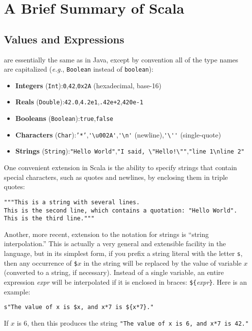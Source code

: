 
\section{A Brief Summary of Scala}
\subsection{Values and Expressions}
 are essentially the same as in Java, except by convention all of the type names are capitalized (\textit{e.g.}, \texttt{Boolean} instead of \texttt{boolean}):
\begin{itemize}
\item \textbf{Integers} (\texttt{Int}):\quad \texttt{0},\quad \texttt{42},\quad \texttt{0x2A} (hexadecimal, base-16)

\item \textbf{Reals} (\texttt{Double}):\quad \texttt{42.0},\quad \texttt{4.2e1},\quad \texttt{.42e+2},\quad \texttt{420e-1}

\item \textbf{Booleans} (\texttt{Boolean}):\quad \texttt{true},\quad \texttt{false}

\item \textbf{Characters} (\texttt{Char}):\quad \texttt{'*'},\quad \verb|'\u002A'|,\quad \verb|'\n'| (newline),\quad \verb|'\''| (single-quote)

\item \textbf{Strings} (\texttt{String}):\quad \texttt{"Hello World"},\quad \verb|"I said, \"Hello!\""|,\quad \verb|"line 1\nline 2"|
\end{itemize}
One convenient extension in Scala is the ability to specify strings that contain special characters, such as quotes and newlines, by enclosing them in triple quotes:
\begin{verbatim}
"""This is a string with several lines.
This is the second line, which contains a quotation: "Hello World".
This is the third line."""
\end{verbatim}
Another, more recent, extension to the notation for strings is ``string interpolation.'' This is actually a very general and extensible facility in the language, but in its simplest form, if you prefix a string literal with the letter \verb|s|, then any occurrence of \verb|$|$x$ in the string will be replaced by the value of variable $x$ (converted to a string, if necessary). Instead of a single variable, an entire expression \textit{expr} will be interpolated if it is enclosed in braces: \verb|${|\textit{expr}\verb|}|. Here is an example:
\begin{verbatim}
s"The value of x is $x, and x*7 is ${x*7}."
\end{verbatim}
If $x$ is 6, then this produces the string \verb|"The value of x is 6, and x*7 is 42."|

